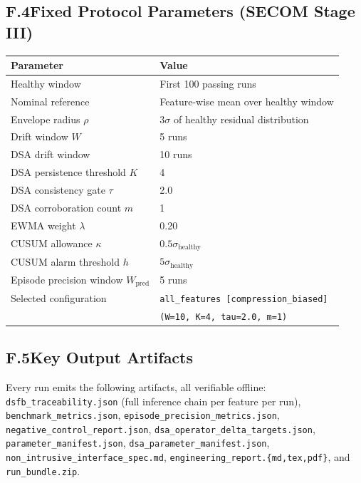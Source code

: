 \documentclass[11pt,letterpaper]{article}
\theoremstyle{scresult}
\begin{document}
\subsection*{F.4\quad Fixed Protocol Parameters (SECOM Stage III)}

\begin{center}
\small\renewcommand{\arraystretch}{1.25}
\begin{tabular}{@{}ll@{}}
\toprule
\textbf{Parameter} & \textbf{Value} \\
\midrule
Healthy window & First 100 passing runs \\
Nominal reference & Feature-wise mean over healthy window \\
Envelope radius $\rho$ & $3\sigma$ of healthy residual distribution \\
Drift window $W$ & 5 runs \\
DSA drift window & 10 runs \\
DSA persistence threshold $K$ & 4 \\
DSA consistency gate $\tau$ & 2.0 \\
DSA corroboration count $m$ & 1 \\
EWMA weight $\lambda$ & 0.20 \\
CUSUM allowance $\kappa$ & $0.5\sigma_\text{healthy}$ \\
CUSUM alarm threshold $h$ & $5\sigma_\text{healthy}$ \\
Episode precision window $W_\text{pred}$ & 5 runs \\
Selected configuration & \texttt{all\_features [compression\_biased]}\\
                       & \texttt{(W=10, K=4, tau=2.0, m=1)} \\
\bottomrule
\end{tabular}
\end{center}

\subsection*{F.5\quad Key Output Artifacts}

Every run emits the following artifacts, all verifiable offline:
\texttt{dsfb\_traceability.json} (full inference chain per feature per run),
\texttt{benchmark\_metrics.json},
\texttt{episode\_precision\_metrics.json},
\texttt{negative\_control\_report.json},
\texttt{dsa\_operator\_delta\_targets.json},
\texttt{parameter\_manifest.json},
\texttt{dsa\_parameter\_manifest.json},
\texttt{non\_intrusive\_interface\_spec.md},
\texttt{engineering\_report.\{md,tex,pdf\}},
and \texttt{run\_bundle.zip}.
\end{document}
